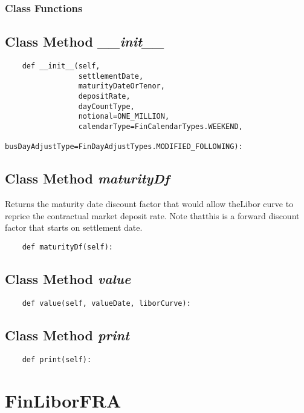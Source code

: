 \documentclass[twoside,11pt]{book}
\begin{document}
\subsubsection{Class Functions}

\subsection{Class Method {\it \_\_init\_\_}}


\begin{lstlisting}
    def __init__(self,
                 settlementDate,
                 maturityDateOrTenor,
                 depositRate,
                 dayCountType,
                 notional=ONE_MILLION,
                 calendarType=FinCalendarTypes.WEEKEND,
                 busDayAdjustType=FinDayAdjustTypes.MODIFIED_FOLLOWING):
\end{lstlisting}

\subsection{Class Method {\it maturityDf}}
Returns the maturity date discount factor that would allow theLibor curve to reprice the contractual market deposit rate. Note thatthis is a forward discount factor that starts on settlement date.

\begin{lstlisting}
    def maturityDf(self):
\end{lstlisting}

\subsection{Class Method {\it value}}


\begin{lstlisting}
    def value(self, valueDate, liborCurve):
\end{lstlisting}

\subsection{Class Method {\it print}}


\begin{lstlisting}
    def print(self):
\end{lstlisting}

\newpage
\section{FinLiborFRA}
\end{document}
